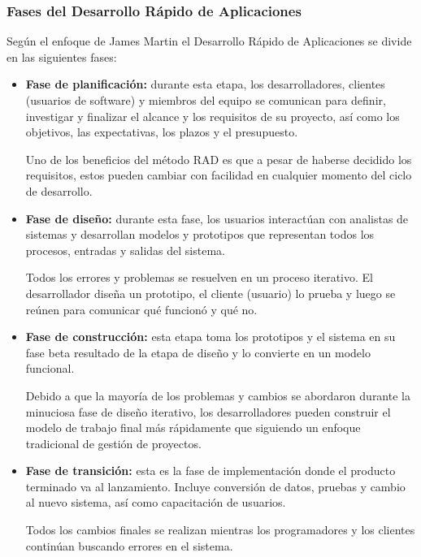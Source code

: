 \subsubsection{Fases del Desarrollo Rápido de Aplicaciones}

Según el enfoque de James Martin \cite{RADJamesMartin} el Desarrollo Rápido de Aplicaciones se divide en las siguientes fases:

\begin{itemize}
    \item \textbf{Fase de planificación:} durante esta etapa, los desarrolladores, clientes (usuarios de software) y miembros del equipo se comunican para definir, investigar y finalizar el alcance y los requisitos de su proyecto, así como los objetivos, las expectativas, los plazos y el presupuesto. 
    
    Uno de los beneficios del método RAD es que a pesar de haberse decidido los requisitos, estos pueden cambiar con facilidad en cualquier momento del ciclo de desarrollo.

    \item \textbf{Fase de diseño:} durante esta fase, los usuarios interactúan con analistas de sistemas y desarrollan modelos y prototipos que representan todos los procesos, entradas y salidas del sistema.
    
    Todos los errores y problemas se resuelven en un proceso iterativo. El desarrollador diseña un prototipo, el cliente (usuario) lo prueba y luego se reúnen para comunicar qué funcionó y qué no.

    \item \textbf{Fase de construcción:} esta etapa toma los prototipos y el sistema en su fase beta resultado de la etapa de diseño y lo convierte en un modelo funcional.

    Debido a que la mayoría de los problemas y cambios se abordaron durante la minuciosa fase de diseño iterativo, los desarrolladores pueden construir el modelo de trabajo final más rápidamente que siguiendo un enfoque tradicional de gestión de proyectos.

    \item \textbf{Fase de transición:} esta es la fase de implementación donde el producto terminado va al lanzamiento. Incluye conversión de datos, pruebas y cambio al nuevo sistema, así como capacitación de usuarios.

    Todos los cambios finales se realizan mientras los programadores y los clientes continúan buscando errores en el sistema.

\end{itemize}


